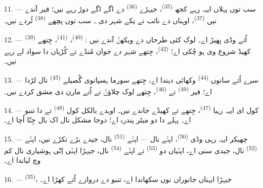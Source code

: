 11. --- سب توں پہلاں ایہہ رہے کجھ  \textsuperscript{(35)}، جیہڑے
 \textsuperscript{(36)} دے اگے اگے دوڑ رہے نیں؛ فیر آندے نیں
 \textsuperscript{(37)}، اوہناں دے نائب تے نِکے شہر دی
۔ سب توں پچھے  \textsuperscript{(38)}
ٹُردے نیں۔

\VUsaut{5.0mm}
\VUsaut{3.6mm}

12. ---  \textsuperscript{(39)} اُتے وڈی بِھیڑ اے۔ لوک کئی
طرحاں دے  ویکھݨ آندے نیں :  \textsuperscript{(40)}،
 \textsuperscript{(41)}، جِتھے کھیڈ شروع وی ہو چُکی اے؛
 \textsuperscript{(42)}، جِتھے شہر دے جوان مُنڈے تے کُڑیاں
 دا سواد لے رہے نیں۔

13. --- سرے اُتے سانوں  \textsuperscript{(44)} وکھائی دیندا اے،
جِتھے سورما ہسپانوی  گُصیلے  \textsuperscript{(45)} نال
لڑدا اے؛ فیر  \textsuperscript{(49)} تے
 \textsuperscript{(46)}، جِتھے لوک 
چلاؤݨ تے  اُتے مارن دی مشق کردے نیں۔

14. --- کول ای ایہہ رہیا  \textsuperscript{(47)}، جِتھے
 تے  کھیڈے جاندے نیں۔ اوہدے بالکل کول
 \textsuperscript{(48)} تے  دا تنبو اے۔ پہلے دا
 دو میٹر پندرہ اے؛ دوجا مشکل نال اک بال جِنّا اُچا اے۔

15. --- چھیکر ایہہ رہی وڈی  \textsuperscript{(50)}، اپݨے
 نال — اپݨے  \textsuperscript{(51)} نال، جیدے
 بڑے تکڑے نیں، اپݨے  \textsuperscript{(52)} نال، جیدی
 سنی اے، اپݨیاں دو  \textsuperscript{(53)} تے اپݨے
 \textsuperscript{(54)} نال، جیہڑا اپݨی  اِنّی
ہوشیاری نال کم وچ لیاندا اے۔

16. ---  \textsuperscript{(55)}، جیہڑا ایہناں جانوراں
نوں سکھاندا اے، تنبو دے دروازے اُتے کھڑا اے۔
\VUsaut{6.0mm}
\VUfilet{22mm}
